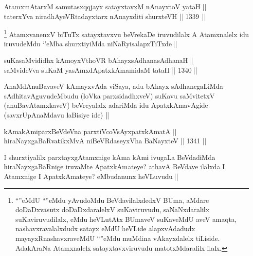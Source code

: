 
\begin{shl}
AtamxmAtarxM samutasxqqjayx satayxtavxM nAnayxtoV yataH || \\
taterxYva niradhAyeVRtadayxtarx nAnayxditi shurxteVH ||  1339 ||  
\end{shl}

\begin{artha}
\footnote{``\stext''eMdU ``\stext''eMdu yAvudoMdu BeVdavilalxdedxV BUma, aMdare doDaDxvasutx doDaDxdaralelxV suKaviruvudu, saNaNxdaralilx suKaviruvudilalx, eMdu heVLutAtx BUmaveV suKaveMdU aveV amaqta, nashavxravalalxdudx satayx eMdU heVLide alapxvAdadudx mayayxRnashavxraveMdU ``\stext''eMdu muMdina vAkayxdalelx tiLiside. AdakAraNa Atamxnalelx satayxtavxviruvudu matotxMdaralilx ilalx.}
AtamxvanenxV biTuTx satayxtavxvu beVrekaDe iruvudilalx A Atamxnalelx idu iruvudeMdu `\stext'eMba shurxtiyiMda niNaRyisalapxTiTxde ||
\end{artha}


\begin{shl}
suKasaMvididhx kAmoyxV\s thoVR bAhayxsAdhanasAdhanaH || \\
saMvideVva suKaM yasAmxdApatxkAmamidaM tataH ||  1340 ||  
\end{shl}

\begin{artha}
AnaMdAnuBavaveV kAmayxvAda viSaya, adu bAhayx sAdhanegaLiMda sAdhitavAguvudeMbudu (loVka parxsidadhxveV) suKavu saMvitetxV (anuBavAtamxkaveV) beVreyalalx adariMda idu ApatxkAmavAgide (savxrUpAnaMdavu laBisiye ide) ||
\end{artha}


\begin{shl}
kAmakAmiparxBeVdeVna parxtiVcoV\s sAyx\s \s patxkAmatA || \\
hiraNayxgaBaRvatikxMvA niBeVRdaseyxVha BaNayxteV ||  1341 ||  
\end{shl}

\begin{artha}
I shurxtiyalilx parxtayxgAtamxnige kAma kAmi ivugaLa BeVdadiMda hiraNayxgaBaRnige iruvaMte ApatxkAmateye? athavA BeVdave ilalxda I Atamxnige I ApatxkAmateye? eMbudanunx heVLuvudu ||
\end{artha}

